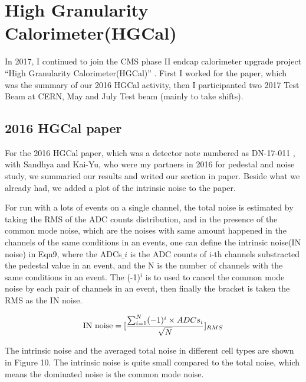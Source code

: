\documentclass{article}
\begin{document}
\section{High Granularity Calorimeter(HGCal)}

In 2017, I continued to join the CMS phase II endcap calorimeter upgrade project ``High Granularity Calorimeter(HGCal)'' \cite{HGCal ref}. First I worked for the paper, which was the summary of our 2016 HGCal activity, then I participanted two 2017 Test Beam at CERN, May and July Test beam (mainly to take shifts). 

\subsection{2016 HGCal paper}

For the 2016 HGCal paper, which was a detector note numbered as DN-17-011 \cite{DN-17-011}, with Sandhya and Kai-Yu, who were my partners in 2016 for pedestal and noise study, we summaried our results and writed our section in paper. Beside what we already had, we added a plot of the intrinsic noise to the paper.  

For run with a lots of events on a single channel, the total noise is estimated by taking the RMS of the ADC counts distribution, and in the presence of the common mode noise, which are the noises with same amount happened in the channels of the same conditions in an events, one can define the intrinsic noise(IN noise) in Eqn9, where the ADCs$\_{i}$ is the ADC counts of i-th channels substracted the pedestal value in an event, and the N is the number of channels with the same conditions in an event. The (-1)$^{i}$ is to used to cancel the common mode noise by each pair of channels in an event, then finally the bracket is taken the RMS as the IN noise. 

\begin{equation}
\textup{IN noise}=[ \frac{\sum_{i=1}^{N}(-1)^{i}\times ADCs_{i}}{\sqrt{N}}  ]_{RMS}
\end{equation}

The intrinsic noise and the averaged total noise in different cell types are shown in Figure 10. The intrinsic noise is quite small compared to the total noise, which means the dominated noise is the common mode noise.
\end{document}
